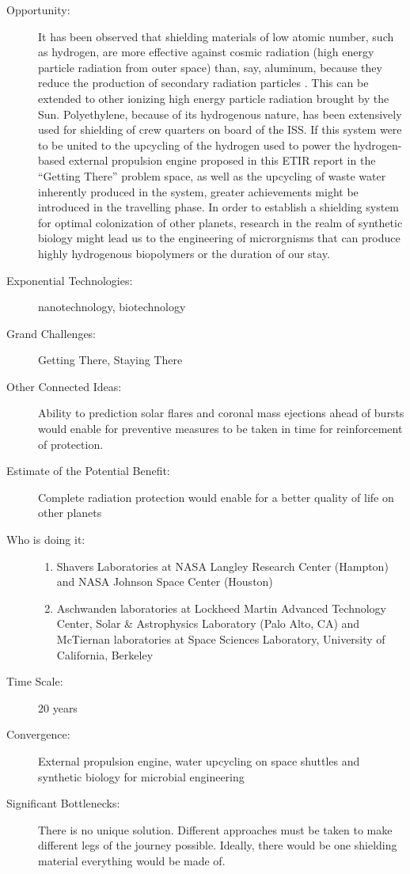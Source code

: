 \begin{description}
\item[Opportunity:] It has been  observed that shielding materials of low atomic number, such as  hydrogen, are more effective against cosmic radiation (high energy  particle radiation from outer space) than, say, aluminum, because they  reduce the production of secondary radiation particles \cite{Aschwanden2010}. This can be extended to other ionizing high energy  particle radiation brought by the Sun. Polyethylene, because of its  hydrogenous nature, has been extensively used for shielding of crew  quarters on board of the ISS. If this system were to be united to the  upcycling of the hydrogen used to power the hydrogen-based external  propulsion engine proposed in this ETIR report in the ``Getting There''  problem space, as well as the upcycling of waste water inherently  produced in the system, greater achievements might be introduced in the  travelling phase. In order to establish a shielding system for optimal  colonization of other planets, research in the realm of synthetic  biology might lead us to the engineering of microrgnisms that can  produce highly hydrogenous biopolymers or the duration of our stay.  
 
\item[Exponential Technologies:]  nanotechnology, biotechnology
 
\item[Grand Challenges:] Getting  There, Staying There
 
\item[Other Connected Ideas:]  Ability to prediction solar flares and coronal mass ejections ahead of  bursts would enable for preventive measures to be taken in time for  reinforcement of protection. 
 
\item[Estimate of the Potential  Benefit:] Complete radiation protection would enable for a better  quality of life on other planets
 
\item[Who is doing it:] 
\hfill\begin{enumerate}
\item Shavers Laboratories at NASA  Langley Research Center (Hampton) and NASA Johnson Space Center  (Houston)
\item Aschwanden laboratories at  Lockheed Martin Advanced Technology Center, Solar \& Astrophysics  Laboratory (Palo Alto, CA) and McTiernan laboratories at Space Sciences  Laboratory, University of California, Berkeley
\end{enumerate}
 
\item[Time Scale:] 20 years
 
\item[Convergence:] External propulsion engine, water upcycling on space shuttles and synthetic  biology for microbial engineering 
 
\item[Significant Bottlenecks:]  There is no unique solution. Different approaches must be taken to make  different legs of the journey possible. Ideally, there would be one  shielding material everything would be made of.
   \end{description}
 
